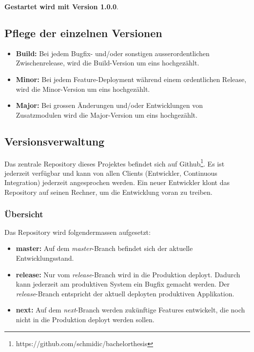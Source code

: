 \textbf{Gestartet wird mit Version 1.0.0}. 
\subsection{Pflege der einzelnen Versionen}
\begin{itemize}
\item \textbf{Build:} Bei jedem Bugfix- und/oder sonstigen ausserordentlichen Zwischenrelease, wird die Build-Version um eins hochgezählt.
\item \textbf{Minor:} Bei jedem Feature-Deployment während einem ordentlichen Release, wird die Minor-Version um eins hochgezählt.
\item \textbf{Major:} Bei grossen Änderungen und/oder Entwicklungen von Zusatzmodulen wird die Major-Version um eins hochgezählt.

\end{itemize}


\subsection{Versionsverwaltung}
Das zentrale Repository dieses Projektes befindet sich auf Github\footnote{https://github.com/schmidic/bachelorthesis}. Es ist jederzeit verfügbar und kann von allen Clients (Entwickler, Continuous Integration) jederzeit angesprochen werden. Ein neuer Entwickler klont das Repository auf seinen Rechner, um die Entwicklung voran zu treiben.
\subsubsection{Übersicht}
Das Repository wird folgendermassen aufgesetzt:
\begin{itemize}
\item \textbf{master:} Auf dem \textit{master}-Branch befindet sich der aktuelle Entwicklungsstand. 
\item \textbf{release:} Nur vom \textit{release}-Branch wird in die Produktion deployt. Dadurch kann jederzeit am produktiven System ein Bugfix gemacht werden. Der \textit{release}-Branch entspricht der aktuell deployten produktiven Applikation.
\item \textbf{next:} Auf dem \textit{next}-Branch werden zukünftige Features entwickelt, die noch nicht in die Produktion deployt werden sollen.
\end{itemize}

